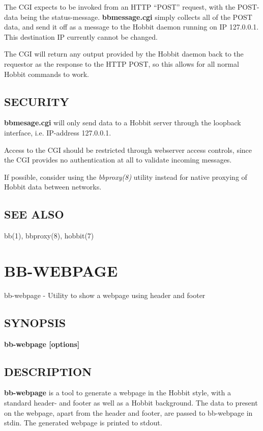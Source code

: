   The CGI expects to be invoked from an HTTP ``POST'' request, with
  the POST-data being the status-message. \textbf{bbmessage.cgi}
  simply collects all of the POST data, and send it off as a message
  to the Hobbit daemon running on IP 127.0.0.1. This destination IP
  currently cannot be changed. 



  The CGI will return any output provided by the Hobbit daemon back to
  the requestor as the response to the HTTP POST, so this allows for
  all normal Hobbit commands to work. 



 
\subsection{SECURITY}
\textbf{bbmesage.cgi} will only send data to a Hobbit server through
the loopback interface, i.e. IP-address 127.0.0.1. 


  Access to the CGI should be restricted through webserver access
  controls, since the CGI provides no authentication at all to
  validate incoming messages. 



  If possible, consider using the \emph{bbproxy(8)}
 utility instead for native proxying of Hobbit data between networks. 


 
\subsection{SEE ALSO}
bb(1), bbproxy(8), hobbit(7) 


%
\newpage
\section{BB-WEBPAGE}
 bb-webpage - Utility to show a webpage using header and footer \
\subsection{SYNOPSIS}
\textbf{bb-webpage [options]}


 
\subsection{DESCRIPTION}
\textbf{bb-webpage} is a tool to generate a webpage in the Hobbit
style, with a standard header- and footer as well as a Hobbit
background. The data to present on the webpage, apart from the header
and footer, are passed to bb-webpage in stdin. The generated webpage
is printed to stdout. 



